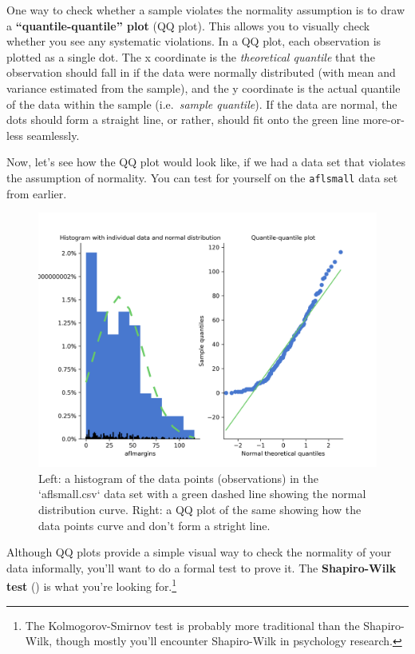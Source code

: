 \documentclass[
  11pt,
  a4paper,
  twoside,symmetric,openright]{book}
\theoremstyle{break}
\theoremstyle{break}
\begin{document}
One way to check whether a sample violates the normality assumption is to draw a \textbf{``quantile-quantile'' plot} (QQ plot). This allows you to visually check whether you see any systematic violations. In a QQ plot, each observation is plotted as a single dot. The x coordinate is the \emph{theoretical quantile} that the observation should fall in if the data were normally distributed (with mean and variance estimated from the sample), and the y coordinate is the actual quantile of the data within the sample (i.e.~\emph{sample quantile}). If the data are normal, the dots should form a straight line, or rather, should fit onto the green line more-or-less seamlessly.

Now, let's see how the QQ plot would look like, if we had a data set that violates the assumption of normality. You can test for yourself on the \texttt{aflsmall} data set from earlier.

\begin{figure}

{\centering \includegraphics[width=0.6\linewidth]{resources/image/aflsmallqq} 

}

\caption{Left: a histogram of the data points (observations) in the `aflsmall.csv` data set with a green dashed line showing the normal distribution curve. Right: a QQ plot of the same showing how the data points curve and don't form a stright line.}\label{fig:aflsmallqq}
\end{figure}

Although QQ plots provide a simple visual way to check the normality of your data informally, you'll want to do a formal test to prove it. The \textbf{Shapiro-Wilk test} () is what you're looking for.\footnote{The Kolmogorov-Smirnov test is probably more traditional than the Shapiro-Wilk, though mostly you'll encounter Shapiro-Wilk in psychology research.}
\end{document}
